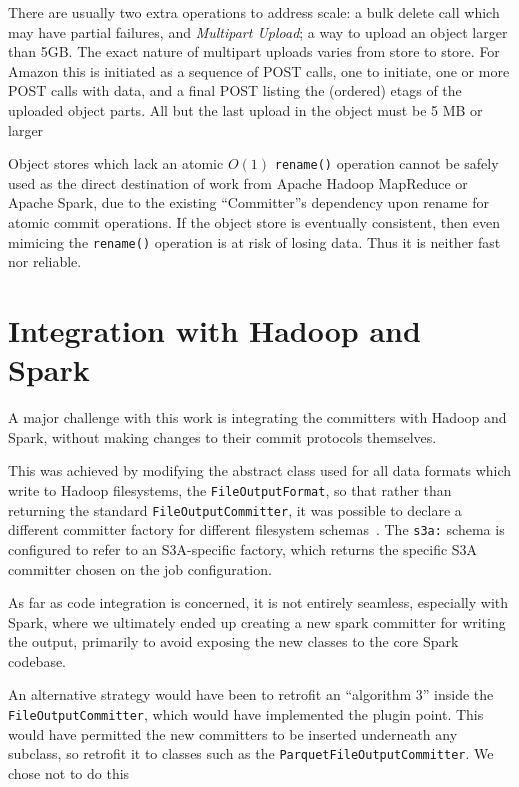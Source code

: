 \documentclass[conference]{IEEEtran}
\begin{document}
There are usually two extra operations to address scale:
 a bulk delete call which may have partial failures,
and \emph{Multipart Upload}; a way to upload an object larger than 5GB\@.
The exact nature of multipart uploads varies from store to store.
For Amazon this is initiated as a sequence of POST calls, one to initiate,
one or more POST calls with data, and a final POST listing the (ordered)
etags of the uploaded object parts.
All but the last upload in the object must be 5 MB or larger


Object stores which lack an atomic $O(1)$ \texttt{rename()} operation cannot
be safely used as the direct destination of work from Apache Hadoop MapReduce
or Apache Spark, due to the existing ``Committer''s dependency upon rename for
atomic commit operations.
If the object store is eventually consistent, then even mimicing the \texttt{rename()}
operation is at risk of losing data.
Thus it is neither fast nor reliable.

\section{Integration with Hadoop and Spark}
\label{sec:integration}

A major challenge with this work is integrating the committers with Hadoop
and Spark, without making changes to their commit protocols themselves.

This was achieved by modifying the abstract class used for all data formats
which write to Hadoop filesystems, the \texttt{FileOutputFormat}, so that rather than
returning the standard \texttt{FileOutputCommitter}, it was possible to declare
a different committer factory for different filesystem schemas\ \cite{MAPREDUCE-6823}.
The \texttt{s3a:} schema is configured to refer to an S3A-specific factory, which
returns the specific S3A committer chosen on the job configuration.


As far as code integration is concerned, it is not entirely seamless, especially
with Spark, where we ultimately ended up creating a new spark committer for
writing the output, primarily to avoid exposing the new classes to the core
Spark codebase.

An alternative strategy would have been to retrofit an ``algorithm 3'' inside
the \texttt{FileOutputCommitter}, which would have implemented the plugin point.
This would have permitted the new committers to be inserted underneath any
subclass, so retrofit it to classes such as the \texttt{ParquetFileOutputCommitter}.
We chose not to do this
\end{document}
